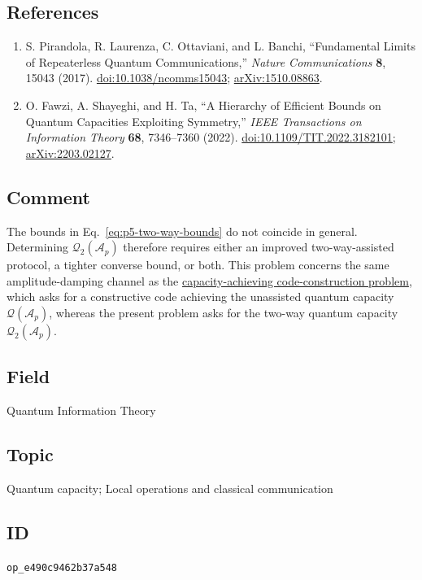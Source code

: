 \subsection*{References}

\begin{enumerate}[label={},leftmargin=4.8em,labelsep=0.5em]
  \footnotesize
  \item[\textup{[PLOB17]}]\label{ref:p5-pirandola}
  S. Pirandola, R. Laurenza, C. Ottaviani, and L. Banchi,
  ``Fundamental Limits of Repeaterless Quantum Communications,''
  \emph{Nature Communications} \textbf{8}, 15043 (2017).
  \href{https://doi.org/10.1038/ncomms15043}{doi:10.1038/ncomms15043};
  \href{https://arxiv.org/pdf/1510.08863}{arXiv:1510.08863}.

  \item[\textup{[FST22]}]\label{ref:p5-fawzi-shayeghi-ta}
  O. Fawzi, A. Shayeghi, and H. Ta,
  ``A Hierarchy of Efficient Bounds on Quantum Capacities Exploiting
  Symmetry,'' \emph{IEEE Transactions on Information Theory} \textbf{68},
  7346--7360 (2022).
  \href{https://doi.org/10.1109/TIT.2022.3182101}{doi:10.1109/TIT.2022.3182101};
  \href{https://arxiv.org/abs/2203.02127}{arXiv:2203.02127}.
\end{enumerate}

\subsection*{Comment}

The bounds in Eq.~\eqref{eq:p5-two-way-bounds} do not coincide in general.
Determining $\mathcal{Q}_2(\mathcal A_p)$ therefore requires either an improved
two-way-assisted protocol, a tighter converse bound, or both.
This problem concerns the same amplitude-damping channel as the
\href{https://qiqc-op.com/problem/op_fcd21a1a5021e464/}{capacity-achieving code-construction problem}, which
asks for a constructive code achieving the unassisted quantum capacity $\mathcal{Q}(\mathcal A_p)$, whereas the present problem asks for the
two-way quantum capacity $\mathcal{Q}_2(\mathcal A_p)$.

\subsection*{Field}

Quantum Information Theory

\subsection*{Topic}

Quantum capacity; Local operations and classical communication

\subsection*{ID}

\texttt{op\_e490c9462b37a548}

